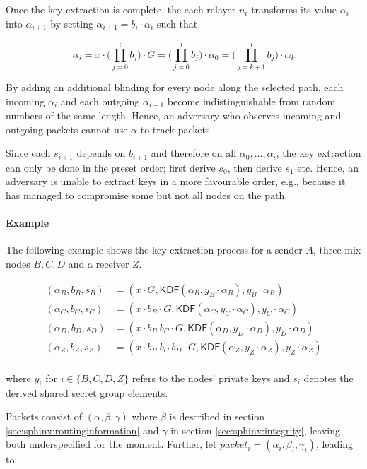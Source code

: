 Once the key extraction is complete, the each relayer $n_i$ transforms its value $\alpha_i$ into $\alpha_{i+1}$ by setting $\alpha_{i+1} = b_i \cdot \alpha_i$ such that

$$ \alpha_i = x \cdot \biggl(\prod_{j=0}^{i} b_j \biggr) \cdot G = \biggl(\prod_{j=0}^{i} b_j \biggr) \cdot \alpha_0 = \biggl(\prod_{j=k+1}^{i} b_j \biggr) \cdot \alpha_k $$

By adding an additional blinding for every node along the selected path, each incoming $\alpha_i$ and each outgoing $\alpha_{i+1}$ become indistinguishable from random numbers of the same length. Hence, an adversary who observes incoming and outgoing packets cannot use $\alpha$ to track packets.

Since each $s_{i+1}$ depends on $b_{i+1}$ and therefore on all $\alpha_0, \dots , \alpha_i$, the key extraction can only be done in the preset order; first derive $s_0$, then derive $s_1$ etc. Hence, an adversary is unable to extract keys in a more favourable order, e.g., because it has managed to compromise some but not all nodes on the path.

\paragraph{Example}

The following example shows the key extraction process for a sender $A$, three mix nodes $B, C, D$ and a receiver $Z$.

\begin{align*}
    (\alpha_B,b_B,s_B) & = (x \cdot G,\textsf{KDF}(\alpha_B, y_B \cdot \alpha_B), y_B \cdot \alpha_B )                   \\
    (\alpha_C,b_C,s_C) & = (x \cdot b_B \cdot G,\textsf{KDF}(\alpha_C, y_C \cdot \alpha_C), y_C \cdot \alpha_C )             \\
    (\alpha_D,b_D,s_D) & = (x \cdot b_B \ b_C \cdot G,\textsf{KDF}(\alpha_D, y_D \cdot \alpha_D), y_D \cdot \alpha_D )       \\
    (\alpha_Z,b_Z,s_Z) & = (x \cdot b_B \ b_C \ b_D \cdot G,\textsf{KDF}(\alpha_Z, y_Z \cdot \alpha_Z), y_Z \cdot \alpha_Z ) \\
\end{align*}

where $y_i$ for $i \in \{ B,C,D,Z \}$ refers to the nodes' private keys and $s_i$ denotes the derived shared secret group elements.

Packets consist of $(\alpha, \beta, \gamma)$ where $\beta$ is described in section \ref{sec:sphinx:routinginformation} and $\gamma$ in section \ref{sec:sphinx:integrity}, leaving both underspecified for the moment. Further, let $packet_i = (\alpha_i, \beta_i, \gamma_i)$, leading to:

